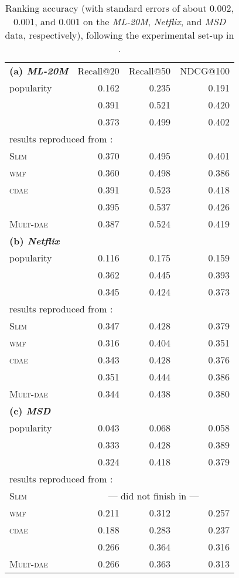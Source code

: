 \documentclass[sigconf]{acmart}
\newcommand{\slim}{{\scshape Slim}}
\newcommand{\wmf}{{\scshape wmf}}
\newcommand{\cdae}{{\scshape cdae}}
\newcommand{\mvae}{}
\newcommand{\mdae}{{\scshape Mult-dae}}
\newcommand{\sae}{}
\begin{document}
\begin{table}
\caption{Ranking accuracy (with standard errors of about 0.002, 0.001, and 0.001 on the \emph{ML-20M}, \emph{Netflix}, and \emph{MSD} data, respectively), following the experimental set-up in \cite{liang18}.}
\label{tab_dawen}
\begin{tabular}{lrrr}
\hline
{\bf(a)\emph{ ML-20M}}  &   Recall@20    &    Recall@50    &    NDCG@100\\
popularity    &    0.162    &    0.235    &   0.191 \\
\sae{}     &    0.391    &    0.521    &   0.420 \\
\sae{}    &  0.373    &  0.499  &  0.402\\
\multicolumn{4}{l}{ results reproduced from \cite{liang18}:}\\
\slim{}    &    0.370    &    0.495    &    0.401\\
\wmf{}     &    0.360    &    0.498    &    0.386\\
\cdae{}     &    0.391    &    0.523    &    0.418\\
\mvae{}     &    0.395    &    0.537    &    0.426\\
\mdae{}     &    0.387    &    0.524    &    0.419\\
\hline
{\bf (b) \emph{Netflix}}&& &\\
popularity    &    0.116    &    0.175    &   0.159 \\
\sae{}     &    0.362    &    0.445    &   0.393 \\
\sae{}    &  0.345    &  0.424  &  0.373\\
\multicolumn{4}{l}{ results reproduced from \cite{liang18}:}\\
\slim{}    &    0.347    &    0.428    &    0.379\\
\wmf{}     &    0.316    &    0.404    &    0.351\\
\cdae{}     &    0.343    &    0.428    &    0.376\\
\mvae{}     &    0.351    &    0.444    &    0.386\\
\mdae{}     &    0.344    &    0.438    &    0.380\\
\hline
{\bf (c)     \emph{MSD}}& & &\\
popularity    &    0.043    &    0.068    &   0.058 \\
\sae{}     &    0.333    &    0.428    &   0.389 \\
\sae{}    &  0.324    &  0.418  &  0.379\\
\multicolumn{4}{l}{ results reproduced from \cite{liang18}: }\\
\slim{}    &    \multicolumn{3}{c}{--- did not finish in \cite{liang18} ---}     \\
\wmf{}     &    0.211    &    0.312    &    0.257\\
\cdae{}     &    0.188    &    0.283    &    0.237\\
\mvae{}     &    0.266    &    0.364    &    0.316\\
\mdae{}     &    0.266    &    0.363    &    0.313\\
\hline
\end{tabular}
\end{table}
\end{document}
